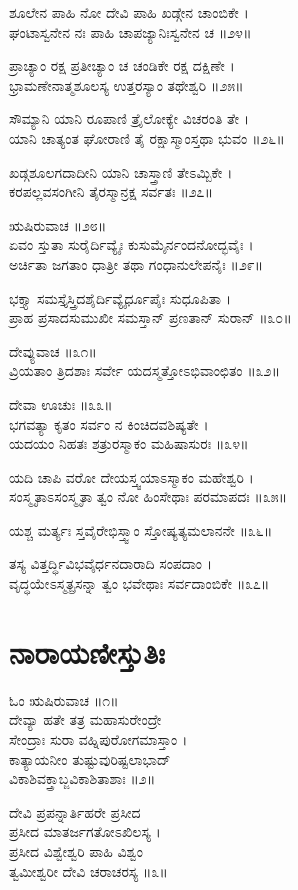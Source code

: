 ಶೂಲೇನ ಪಾಹಿ ನೋ ದೇವಿ ಪಾಹಿ ಖಡ್ಗೇನ ಚಾಂಬಿಕೇ ।\\
ಘಂಟಾಸ್ವನೇನ ನಃ ಪಾಹಿ ಚಾಪಜ್ಯಾನಿಃಸ್ವನೇನ ಚ ॥೨೪॥

ಪ್ರಾಚ್ಯಾಂ ರಕ್ಷ ಪ್ರತೀಚ್ಯಾಂ ಚ ಚಂಡಿಕೇ ರಕ್ಷ ದಕ್ಷಿಣೇ ।\\
ಭ್ರಾಮಣೇನಾತ್ಮಶೂಲಸ್ಯ ಉತ್ತರಸ್ಯಾಂ ತಥೇಶ್ವರಿ ॥೨೫॥

ಸೌಮ್ಯಾನಿ ಯಾನಿ ರೂಪಾಣಿ ತ್ರೈಲೋಕ್ಯೇ ವಿಚರಂತಿ ತೇ ।\\
ಯಾನಿ ಚಾತ್ಯಂತ ಘೋರಾಣಿ ತೈ ರಕ್ಷಾಸ್ಮಾಂಸ್ತಥಾ ಭುವಂ ॥೨೬॥

ಖಡ್ಗಶೂಲಗದಾದೀನಿ ಯಾನಿ ಚಾಸ್ತ್ರಾಣಿ ತೇಽಮ್ಬಿಕೇ ।\\
ಕರಪಲ್ಲವಸಂಗೀನಿ ತೈರಸ್ಮಾನ್ರಕ್ಷ ಸರ್ವತಃ ॥೨೭॥

 ಋಷಿರುವಾಚ ॥೨೮॥\\
ಏವಂ ಸ್ತುತಾ ಸುರೈರ್ದಿವ್ಯೈಃ ಕುಸುಮೈರ್ನಂದನೋದ್ಭವೈಃ ।\\
ಅರ್ಚಿತಾ ಜಗತಾಂ ಧಾತ್ರೀ ತಥಾ ಗಂಧಾನುಲೇಪನೈಃ ॥೨೯॥

ಭಕ್ತ್ಯಾ ಸಮಸ್ತೈಸ್ತ್ರಿದಶೈರ್ದಿವ್ಯೈರ್ಧೂಪೈಃ ಸುಧೂಪಿತಾ ।\\
ಪ್ರಾಹ ಪ್ರಸಾದಸುಮುಖೀ ಸಮಸ್ತಾನ್ ಪ್ರಣತಾನ್ ಸುರಾನ್ ॥೩೦॥

ದೇವ್ಯುವಾಚ ॥೩೧॥\\
ವ್ರಿಯತಾಂ ತ್ರಿದಶಾಃ ಸರ್ವೇ ಯದಸ್ಮತ್ತೋಽಭಿವಾಂಛಿತಂ ॥೩೨॥

ದೇವಾ ಊಚುಃ ॥೩೩॥\\
\newpage
ಭಗವತ್ಯಾ ಕೃತಂ ಸರ್ವಂ ನ ಕಿಂಚಿದವಶಿಷ್ಯತೇ ।\\
ಯದಯಂ ನಿಹತಃ ಶತ್ರುರಸ್ಮಾಕಂ ಮಹಿಷಾಸುರಃ ॥೩೪॥

ಯದಿ ಚಾಪಿ ವರೋ ದೇಯಸ್ತ್ವಯಾಽಸ್ಮಾಕಂ ಮಹೇಶ್ವರಿ ।\\
ಸಂಸ್ಮೃತಾಽಸಂಸ್ಮೃತಾ ತ್ವಂ ನೋ ಹಿಂಸೇಥಾಃ ಪರಮಾಪದಃ ॥೩೫॥

ಯಶ್ಚ ಮರ್ತ್ಯಃ ಸ್ತವೈರೇಭಿಸ್ತ್ವಾಂ ಸ್ತೋಷ್ಯತ್ಯಮಲಾನನೇ ॥೩೬॥

ತಸ್ಯ ವಿತ್ತರ್ದ್ಧಿವಿಭವೈರ್ಧನದಾರಾದಿ ಸಂಪದಾಂ ।\\
ವೃದ್ಧಯೇಽಸ್ಮತ್ಪ್ರಸನ್ನಾ ತ್ವಂ ಭವೇಥಾಃ ಸರ್ವದಾಂಬಿಕೇ ॥೩೭॥


\section{ನಾರಾಯಣೀಸ್ತುತಿಃ}
ಓಂ ಋಷಿರುವಾಚ ॥೧॥\\
ದೇವ್ಯಾ ಹತೇ ತತ್ರ ಮಹಾಸುರೇಂದ್ರೇ\\
        ಸೇಂದ್ರಾಃ ಸುರಾ ವಹ್ನಿಪುರೋಗಮಾಸ್ತಾಂ ।\\
ಕಾತ್ಯಾಯನೀಂ ತುಷ್ಟುವುರಿಷ್ಟಲಾಭಾದ್\\
      ವಿಕಾಶಿವಕ್ತ್ರಾಬ್ಜವಿಕಾಶಿತಾಶಾಃ ॥೨॥

ದೇವಿ ಪ್ರಪನ್ನಾರ್ತಿಹರೇ ಪ್ರಸೀದ\\
        ಪ್ರಸೀದ ಮಾತರ್ಜಗತೋಽಖಿಲಸ್ಯ ।\\
ಪ್ರಸೀದ ವಿಶ್ವೇಶ್ವರಿ ಪಾಹಿ ವಿಶ್ವಂ\\
        ತ್ವಮೀಶ್ವರೀ ದೇವಿ ಚರಾಚರಸ್ಯ ॥೩॥

